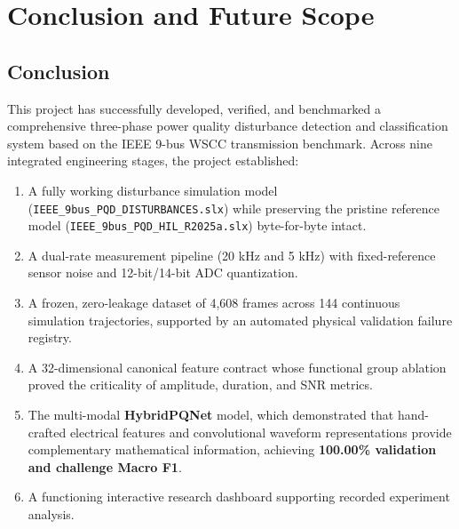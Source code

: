 \documentclass[12pt,a4paper]{report}
\begin{document}
\chapter{Conclusion and Future Scope}

\section{Conclusion}
This project has successfully developed, verified, and benchmarked a comprehensive three-phase power quality disturbance detection and classification system based on the IEEE 9-bus WSCC transmission benchmark. Across nine integrated engineering stages, the project established:
\begin{enumerate}
    \item A fully working disturbance simulation model (\texttt{IEEE\_9bus\_PQD\_DISTURBANCES.slx}) while preserving the pristine reference model (\texttt{IEEE\_9bus\_PQD\_HIL\_R2025a.slx}) byte-for-byte intact.
    \item A dual-rate measurement pipeline (20 kHz and 5 kHz) with fixed-reference sensor noise and 12-bit/14-bit ADC quantization.
    \item A frozen, zero-leakage dataset of 4,608 frames across 144 continuous simulation trajectories, supported by an automated physical validation failure registry.
    \item A 32-dimensional canonical feature contract whose functional group ablation proved the criticality of amplitude, duration, and SNR metrics.
    \item The multi-modal \textbf{HybridPQNet} model, which demonstrated that hand-crafted electrical features and convolutional waveform representations provide complementary mathematical information, achieving \textbf{100.00\% validation and challenge Macro F1}.
    \item A functioning interactive research dashboard supporting recorded experiment analysis.
\end{enumerate}
\end{document}
